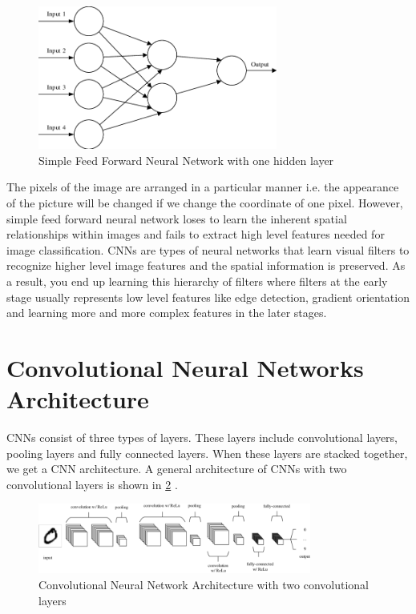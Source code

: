 \begin{figure}[H]
	\centering
		\includegraphics[width=0.70\textwidth]{CHAPTERS/Chapter-3/Images/3.2.png}
	\caption{Simple Feed Forward Neural Network with one hidden layer}
	\label{fig:3.2}
\end{figure}

The pixels of the image are arranged in a particular 
manner i.e. the appearance of the picture will be changed 
if we change the coordinate of one pixel. However, simple feed 
forward neural network loses to learn the inherent spatial 
relationships within images and fails to extract high level features 
needed for image classification. CNNs are types 
of neural networks that learn visual filters to recognize higher level 
image features and the spatial information is preserved. As a result, you 
end up learning this hierarchy of filters where filters at the early stage 
usually represents low level features like edge detection, gradient orientation 
and learning more and more complex features in the later stages.

\section{Convolutional Neural Networks Architecture}

CNNs consist of three types of layers. These layers 
include convolutional layers, pooling layers and fully connected layers. When 
these layers are stacked together, we get a CNN architecture. A general
architecture of CNNs with two convolutional layers is shown in \ref{fig:3.3} \cite{chap_3_article:2}.

\begin{figure}[H]
	\centering
		\includegraphics[width=0.80\textwidth]{CHAPTERS/Chapter-3/Images/3.3}
	\caption{Convolutional Neural Network Architecture with two convolutional layers}
	\label{fig:3.3}
\end{figure}

